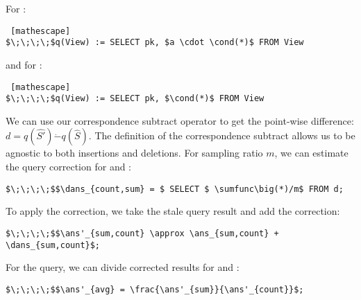 \vspace{.5em}

\noindent For \sumfunc:
\begin{lstlisting} [mathescape]
$\;\;\;\;$q(View) := SELECT pk, $a \cdot \cond(*)$ FROM View
\end{lstlisting}

\noindent and for \countfunc:
\begin{lstlisting} [mathescape]
$\;\;\;\;$q(View) := SELECT pk, $\cond(*)$ FROM View
\end{lstlisting}

We can use our correspondence subtract operator to get the point-wise difference:
$d = q(\hat{S'}) \dot{-} q(\hat{S})$.  
The definition of the correspondence subtract allows us to be agnostic to both insertions and deletions.
For sampling ratio $m$, we can estimate the query correction for \sumfunc and \countfunc:
\begin{lstlisting}[mathescape,basicstyle={\scriptsize}]
$\;\;\;\;$$\dans_{count,sum} = $ SELECT $ \sumfunc\big(*)/m$ FROM d;
\end{lstlisting}
To apply the correction, we take the stale query result and add the correction:
\begin{lstlisting}[mathescape,basicstyle={\scriptsize}]
$\;\;\;\;$$\ans'_{sum,count} \approx \ans_{sum,count} + \dans_{sum,count}$;
\end{lstlisting}

For the \avgfunc query, we can divide corrected results for \sumfunc and \countfunc:
\begin{lstlisting}[mathescape,basicstyle={\scriptsize}]
$\;\;\;\;$$\ans'_{avg} = \frac{\ans'_{sum}}{\ans'_{count}}$;
\end{lstlisting}

\iffalse
\vspace{-1em}
\begin{lstlisting}[mathescape,basicstyle={\scriptsize}]
$\;\;\;\;$$\dans_{count} = $ SELECT $ \sumfunc\big(*)/m$ FROM d;
\end{lstlisting}
\vspace{-1em}

We use the estimated correction to correct the stale query result as follows:
\begin{lstlisting}[mathescape,basicstyle={\scriptsize}]
$\;\;\;\;$$\sumfunc(S') \approx \sumfunc(S) + \dans_{sum}$;
\end{lstlisting}
\vspace{-1em}
\begin{lstlisting}[mathescape,basicstyle={\scriptsize}]
$\;\;\;\;$$\countfunc(S') \approx \countfunc(S) + \dans_{count}$;
\end{lstlisting}
\vspace{-1em}
\fi

